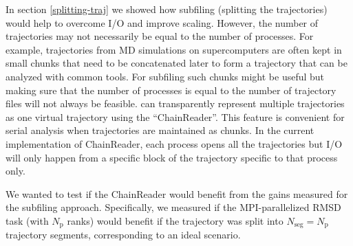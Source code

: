 \label{sec:chainreader}

In section \ref{splitting-traj} we showed how subfiling (splitting the trajectories) would help to overcome I/O and improve scaling. 
However, the number of trajectories may not necessarily be equal to the number of processes.
For example, trajectories from MD simulations on supercomputers are often kept in small chunks that need to be concatenated later to form a trajectory that can be analyzed with common tools.
For subfiling such chunks might be useful but making sure that the number of processes is equal to the number of trajectory files will not always be feasible. 
 can transparently represent multiple trajectories as one virtual trajectory using the ``ChainReader''.
This feature is  convenient for serial analysis when trajectories are maintained as chunks.
In the current implementation of ChainReader, each process opens all the trajectories but I/O will only happen from a specific block of the trajectory specific to that process only.

We wanted to test if the ChainReader would benefit from the gains measured for the subfiling approach.
Specifically, we measured if the MPI-parallelized RMSD task (with $N_{\text{p}}$ ranks) would benefit if the trajectory was split into $N_{\text{seg}} = N_{\text{p}}$ trajectory segments, corresponding to an ideal scenario.
 
